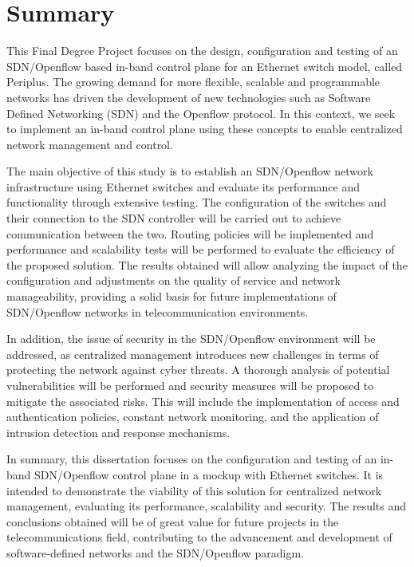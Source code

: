 \documentclass[a4paper, 12pt]{book}
\begin{document}
	\chapter*{Summary}
	
	This Final Degree Project focuses on the design, configuration and testing of an SDN/Openflow based in-band control plane for an Ethernet switch model, called Periplus. The growing demand for more flexible, scalable and programmable networks has driven the development of new technologies such as Software Defined Networking (SDN) and the Openflow protocol. In this context, we seek to implement an in-band control plane using these concepts to enable centralized network management and control.

	The main objective of this study is to establish an SDN/Openflow network infrastructure using Ethernet switches and evaluate its performance and functionality through extensive testing. The configuration of the switches and their connection to the SDN controller will be carried out to achieve communication between the two. Routing policies will be implemented and performance and scalability tests will be performed to evaluate the efficiency of the proposed solution. The results obtained will allow analyzing the impact of the configuration and adjustments on the quality of service and network manageability, providing a solid basis for future implementations of SDN/Openflow networks in telecommunication environments.

	In addition, the issue of security in the SDN/Openflow environment will be addressed, as centralized management introduces new challenges in terms of protecting the network against cyber threats. A thorough analysis of potential vulnerabilities will be performed and security measures will be proposed to mitigate the associated risks. This will include the implementation of access and authentication policies, constant network monitoring, and the application of intrusion detection and response mechanisms.
	
	In summary, this dissertation focuses on the configuration and testing of an in-band SDN/Openflow control plane in a mockup with Ethernet switches. It is intended to demonstrate the viability of this solution for centralized network management, evaluating its performance, scalability and security. The results and conclusions obtained will be of great value for future projects in the telecommunications field, contributing to the advancement and development of software-defined networks and the SDN/Openflow paradigm.
	
\end{document}
